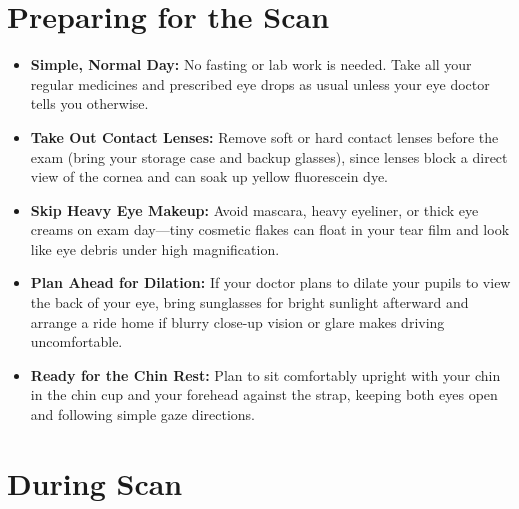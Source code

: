 \section{Preparing for the Scan}

\begin{itemize}
    \item \textbf{Simple, Normal Day:} No fasting or lab work is needed. Take all your regular medicines and prescribed eye drops as usual unless your eye doctor tells you otherwise.
    \item \textbf{Take Out Contact Lenses:} Remove soft or hard contact lenses before the exam (bring your storage case and backup glasses), since lenses block a direct view of the cornea and can soak up yellow fluorescein dye.
    \item \textbf{Skip Heavy Eye Makeup:} Avoid mascara, heavy eyeliner, or thick eye creams on exam day---tiny cosmetic flakes can float in your tear film and look like eye debris under high magnification.
    \item \textbf{Plan Ahead for Dilation:} If your doctor plans to dilate your pupils to view the back of your eye, bring sunglasses for bright sunlight afterward and arrange a ride home if blurry close-up vision or glare makes driving uncomfortable.
    \item \textbf{Ready for the Chin Rest:} Plan to sit comfortably upright with your chin in the chin cup and your forehead against the strap, keeping both eyes open and following simple gaze directions.
\end{itemize}

\section{During Scan}

